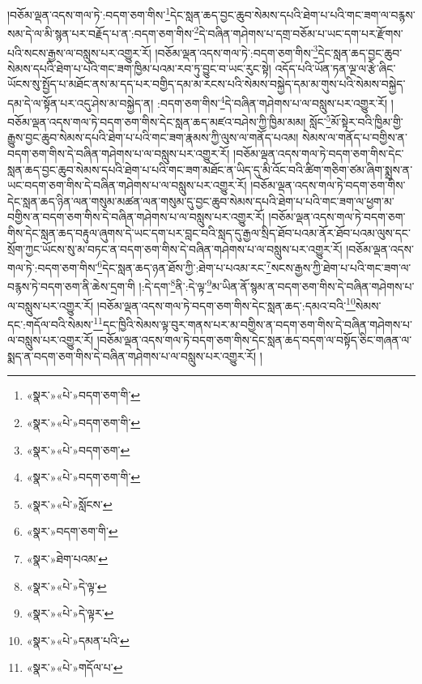 །བཅོམ་ལྡན་འདས་གལ་ཏེ་:བདག་ཅག་གིས་\footnote{«སྣར་»«པེ་»བདག་ཅག་གི་}དེང་སླན་ཆད་བྱང་ཆུབ་སེམས་དཔའི་ཐེག་པ་པའི་གང་ཟག་ལ་བརྙས་སམ་དེ་ལ་མི་སྙན་པར་བརྗོད་པ་ན་:བདག་ཅག་གིས་\footnote{«སྣར་»«པེ་»བདག་ཅག་གི་}དེ་བཞིན་གཤེགས་པ་དགྲ་བཅོམ་པ་ཡང་དག་པར་རྫོགས་པའི་སངས་རྒྱས་ལ་བསླུས་པར་འགྱུར་རོ། །བཅོམ་ལྡན་འདས་གལ་ཏེ་:བདག་ཅག་གིས་\footnote{«སྣར་»«པེ་»བདག་ཅག་}དེང་སླན་ཆད་བྱང་ཆུབ་སེམས་དཔའི་ཐེག་པ་པའི་གང་ཟག་ཁྱིམ་པའམ་རབ་ཏུ་བྱུང་བ་ཡང་རུང་སྟེ། འདོད་པའི་ཡོན་ཏན་ལྔ་ལ་རྩེ་ཞིང་ཡོངས་སུ་སྤྱོད་པ་མཐོང་ནས་མ་དད་པར་བགྱིད་དམ་མ་རངས་པའི་སེམས་བསྐྱེད་དམ་མ་གུས་པའི་སེམས་བསྐྱེད་དམ་དེ་ལ་སྟོན་པར་འདུ་ཤེས་མ་བསྐྱེད་ན། :བདག་ཅག་གིས་\footnote{«སྣར་»«པེ་»བདག་ཅག་གི་}དེ་བཞིན་གཤེགས་པ་ལ་བསླུས་པར་འགྱུར་རོ། །བཅོམ་ལྡན་འདས་གལ་ཏེ་བདག་ཅག་གིས་དེང་སླན་ཆད་མཛའ་བཤེས་ཀྱི་ཁྱིམ་མམ། སློང་\footnote{«སྣར་»«པེ་»སློངས་}མོ་སྟེར་བའི་ཁྱིམ་གྱི་རྒྱུས་བྱང་ཆུབ་སེམས་དཔའི་ཐེག་པ་པའི་གང་ཟག་རྣམས་ཀྱི་ལུས་ལ་གནོད་པའམ། སེམས་ལ་གནོད་པ་བགྱིས་ན་བདག་ཅག་གིས་དེ་བཞིན་གཤེགས་པ་ལ་བསླུས་པར་འགྱུར་རོ། །བཅོམ་ལྡན་འདས་གལ་ཏེ་བདག་ཅག་གིས་དེང་སླན་ཆད་བྱང་ཆུབ་སེམས་དཔའི་ཐེག་པ་པའི་གང་ཟག་མཐོང་ན་ཡིད་དུ་མི་འོང་བའི་ཚིག་གཅིག་ཙམ་ཞིག་སྨྲས་ན་ཡང་བདག་ཅག་གིས་དེ་བཞིན་གཤེགས་པ་ལ་བསླུས་པར་འགྱུར་རོ། །བཅོམ་ལྡན་འདས་གལ་ཏེ་བདག་ཅག་གིས་དེང་སླན་ཆད་ཉིན་ལན་གསུམ་མཚན་ལན་གསུམ་དུ་བྱང་ཆུབ་སེམས་དཔའི་ཐེག་པ་པའི་གང་ཟག་ལ་ཕྱག་མ་བགྱིས་ན་བདག་ཅག་གིས་དེ་བཞིན་གཤེགས་པ་ལ་བསླུས་པར་འགྱུར་རོ། །བཅོམ་ལྡན་འདས་གལ་ཏེ་བདག་ཅག་གིས་དེང་སླན་ཆད་བརྟུལ་ཞུགས་དེ་ཡང་དག་པར་བླང་བའི་སླད་དུ་རྒྱལ་སྲིད་ཐོབ་པའམ་ནོར་ཐོབ་པའམ་ལུས་དང་སྲོག་ཀྱང་ཡོངས་སུ་མ་བཏང་ན་བདག་ཅག་གིས་དེ་བཞིན་གཤེགས་པ་ལ་བསླུས་པར་འགྱུར་རོ། །བཅོམ་ལྡན་འདས་གལ་ཏེ་:བདག་ཅག་གིས་\footnote{«སྣར་»བདག་ཅག་གི་}དེང་སླན་ཆད་ཉན་ཐོས་ཀྱི་:ཐེག་པ་པའམ་རང་\footnote{«སྣར་»ཐེག་པའམ་}སངས་རྒྱས་ཀྱི་ཐེག་པ་པའི་གང་ཟག་ལ་བརྙས་ཏེ་བདག་ཅག་ནི་ཆེས་དྲག་གི །:དེ་དག་\footnote{«སྣར་»«པེ་»དེ་ལྟ་}ནི་:དེ་ལྟ་\footnote{«སྣར་»«པེ་»དེ་ལྟར་}མ་ཡིན་ནོ་སྙམ་ན་བདག་ཅག་གིས་དེ་བཞིན་གཤེགས་པ་ལ་བསླུས་པར་འགྱུར་རོ། །བཅོམ་ལྡན་འདས་གལ་ཏེ་བདག་ཅག་གིས་དེང་སླན་ཆད་:དམའ་བའི་\footnote{«སྣར་»«པེ་»དམན་པའི་}སེམས་དང་:གདོལ་བའི་སེམས་\footnote{«སྣར་»«པེ་»གདོལ་པ་}དང་ཁྱིའི་སེམས་ལྟ་བུར་གནས་པར་མ་བགྱིས་ན་བདག་ཅག་གིས་དེ་བཞིན་གཤེགས་པ་ལ་བསླུས་པར་འགྱུར་རོ། །བཅོམ་ལྡན་འདས་གལ་ཏེ་བདག་ཅག་གིས་དེང་སླན་ཆད་བདག་ལ་བསྟོད་ཅིང་གཞན་ལ་སྨད་ན་བདག་ཅག་གིས་དེ་བཞིན་གཤེགས་པ་ལ་བསླུས་པར་འགྱུར་རོ། །
